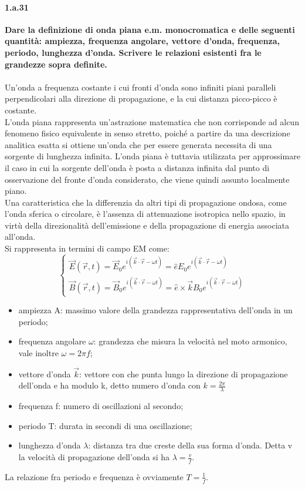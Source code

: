 \documentclass[twoside]{article}
\begin{document}
\paragraph{1.a.31} \textbf{Dare la definizione di onda piana e.m. monocromatica e delle seguenti quantità:
ampiezza, frequenza angolare, vettore d’onda, frequenza, periodo, lunghezza
d’onda. Scrivere le relazioni esistenti fra le grandezze sopra definite.}\\
\\
Un'onda a frequenza costante i cui fronti d'onda sono infiniti piani paralleli perpendicolari alla direzione di propagazione, e la cui distanza picco-picco è costante.\\
L'onda piana rappresenta un'astrazione matematica che non corrisponde ad alcun fenomeno fisico equivalente in senso stretto, poiché a partire da una descrizione analitica esatta si ottiene un'onda che per essere generata necessita di una sorgente di lunghezza infinita. L'onda piana è tuttavia utilizzata per approssimare il caso in cui la sorgente dell'onda è posta a distanza infinita dal punto di osservazione del fronte d'onda considerato, che viene quindi assunto localmente piano.\\
Una caratteristica che la differenzia da altri tipi di propagazione ondosa, come l'onda sferica o circolare, è l'assenza di attenuazione isotropica nello spazio, in virtù della direzionalità dell'emissione e della propagazione di energia associata all'onda.\\
Si rappresenta in termini di campo EM come:
\begin{equation}
    \begin{cases}
    \Vec{E}(\Vec{r},t)=\Vec{E}_0 e^{i(\Vec{k}\cdot\Vec{r}-\omega t)}= \hat{e}E_0 e^{i(\Vec{k}\cdot\Vec{r}-\omega t)}\\
    \Vec{B}(\Vec{r},t)=\Vec{B}_0 e^{i(\Vec{k}\cdot\Vec{r}-\omega t)}=\hat{e}\times\vec{k} B_0 e^{i(\Vec{k}\cdot\Vec{r}-\omega t)}
    \end{cases}
\end{equation}
\begin{itemize}
    \item ampiezza A: massimo valore della grandezza rappresentativa dell'onda in un periodo;
    \item frequenza angolare $\omega$: grandezza che misura la velocità nel moto armonico, vale inoltre $\omega=2\pi f$;
    \item vettore d'onda $\Vec{k}$: vettore con che punta lungo la direzione di propagazione dell'onda e ha modulo k, detto numero d'onda con $k=\frac{2\pi}{\lambda}$
    \item frequenza f: numero di oscillazioni al secondo;
    \item periodo T: durata in secondi di una oscillazione;
    \item lunghezza d'onda $\lambda$: distanza tra due creste della sua forma d'onda. Detta v la velocità di propagazione dell'onda si ha $\lambda=\frac{v}{f}$.
\end{itemize}
La relazione fra periodo e frequenza è ovviamente $T=\frac{1}{f}$.\\
\end{document}

